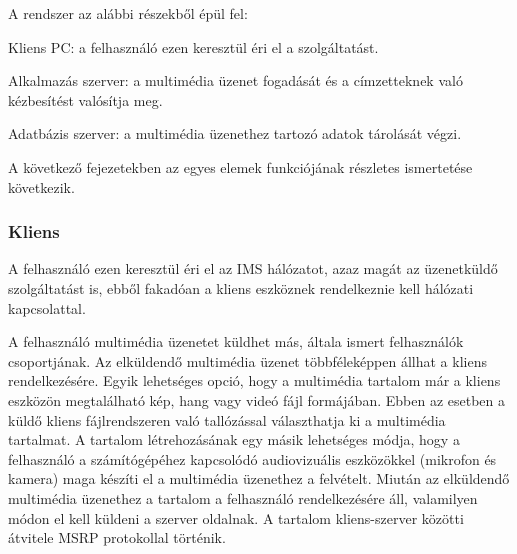 \newpage

A rendszer az alábbi részekből épül fel:
\begin{mydescription}
\item[Kliens PC:] a felhasználó ezen keresztül éri el a szolgáltatást.
\item[Alkalmazás szerver:] a multimédia üzenet fogadását és a címzetteknek való kézbesítést valósítja meg.
\item[Adatbázis szerver:] a multimédia üzenethez tartozó adatok tárolását végzi.
\end{mydescription}

A következő fejezetekben az egyes elemek funkciójának részletes ismertetése következik.

\subsubsection{Kliens}
\label{sec:kliens_pc}

A felhasználó ezen keresztül éri el az IMS hálózatot, azaz magát az üzenetküldő szolgáltatást is, ebből fakadóan a kliens eszköznek rendelkeznie kell hálózati kapcsolattal.

A felhasználó multimédia üzenetet küldhet más, általa ismert felhasználók csoportjának. Az elküldendő multimédia üzenet többféleképpen állhat a kliens rendelkezésére. Egyik lehetséges opció, hogy a multimédia tartalom már a kliens eszközön megtalálható kép, hang vagy videó fájl formájában. Ebben az esetben a küldő kliens fájlrendszeren való tallózással választhatja ki a multimédia tartalmat. A tartalom létrehozásának egy másik lehetséges módja, hogy a felhasználó a számítógépéhez kapcsolódó audiovizuális eszközökkel (mikrofon és kamera) maga készíti el a multimédia üzenethez a felvételt. Miután az elküldendő multimédia üzenethez a tartalom a felhasználó rendelkezésére áll, valamilyen módon el kell küldeni a szerver oldalnak. A tartalom kliens-szerver közötti átvitele MSRP protokollal történik.

